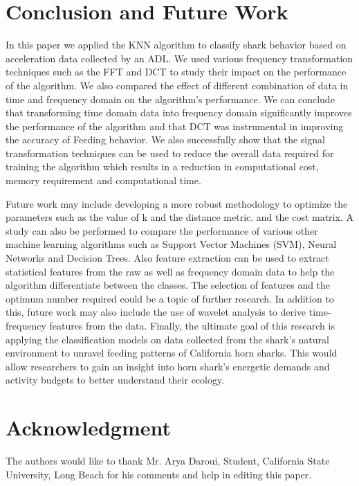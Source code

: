 \documentclass[conference]{IEEEtran}
\begin{document}
\section{Conclusion and Future Work}
In this paper we applied the KNN algorithm to classify shark behavior based on acceleration data collected by an ADL. We used various frequency transformation techniques such as the FFT and DCT to study their impact on the performance of the algorithm. We also compared the effect of different combination of data in time and frequency domain on the algorithm’s performance. We can conclude that transforming time domain data into frequency domain significantly improves the performance of the algorithm and that DCT was instrumental in improving the accuracy of Feeding behavior.  We also successfully show that the signal transformation techniques can be used to reduce the overall data required for training the algorithm which results in a reduction in computational cost, memory requirement and computational time.

Future work may include developing a more robust methodology to optimize the parameters such as the value of k and the distance metric. and the cost matrix. A study can also be performed to  compare the performance of various other machine learning algorithms such as Support Vector Machines (SVM), Neural Networks and Decision Trees. Also feature extraction can be used to extract statistical features from the raw as well as frequency domain data to help the algorithm differentiate between the classes. The selection of features and the optimum number required could be a topic of further research. In addition to this, future work may also include the use of wavelet analysis to derive time-frequency features from the data.  Finally, the ultimate goal of this research is applying the classification models on data collected from the shark’s natural environment to unravel feeding patterns of California horn sharks. This would allow researchers to gain an insight into horn shark’s energetic demands and activity budgets to better understand their ecology.

\section{Acknowledgment}

The authors would like to thank Mr. Arya Daroui, Student, California State University, Long Beach for his comments and help in editing this paper.



\end{document}
